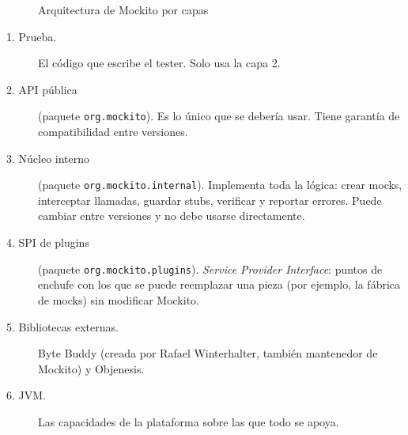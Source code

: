 \documentclass[11pt,a4paper,oneside]{report}
\newcommand{\code}[1]{\texttt{#1}}
\begin{document}
\begin{figure}[H]
\caption{Arquitectura de Mockito por capas}
\label{fig:capas}
\end{figure}

\begin{description}
  \item[1. Prueba.] El código que escribe el tester. Solo usa la capa 2.
  \item[2. API pública] (paquete \code{org.mockito}). Es lo único que se debería usar. Tiene garantía de compatibilidad entre versiones.
  \item[3. Núcleo interno] (paquete \code{org.mockito.internal}). Implementa toda la lógica: crear mocks, interceptar llamadas, guardar stubs, verificar y reportar errores. Puede cambiar entre versiones y no debe usarse directamente.
  \item[4. SPI de plugins] (paquete \code{org.mockito.plugins}). \emph{Service Provider Interface}: puntos de enchufe con los que se puede reemplazar una pieza (por ejemplo, la fábrica de mocks) sin modificar Mockito.
  \item[5. Bibliotecas externas.] Byte Buddy (creada por Rafael Winterhalter, también mantenedor de Mockito) y Objenesis.
  \item[6. JVM.] Las capacidades de la plataforma sobre las que todo se apoya.
\end{description}
\end{document}

